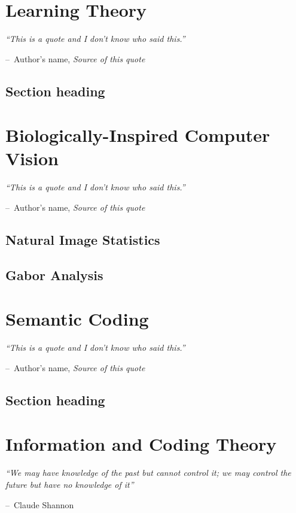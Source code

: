\documentclass[a4paper,11pt]{book}
\makeatletter
\newenvironment{chapquote}[2][2em]
  {\setlength{\@tempdima}{#1}%
   \def\chapquote@author{#2}%
   \parshape 1 \@tempdima \dimexpr\textwidth-2\@tempdima\relax%
   \itshape}
  {\par\normalfont\hfill--\ \chapquote@author\hspace*{\@tempdima}\par\bigskip}
\makeatother
\begin{document}
\chapter{Learning Theory}

\begin{chapquote}{Author's name, \textit{Source of this quote}}
``This is a quote and I don't know who said this.''
\end{chapquote}

\section{Section heading}


\chapter{Biologically-Inspired Computer Vision}

\begin{chapquote}{Author's name, \textit{Source of this quote}}
``This is a quote and I don't know who said this.''
\end{chapquote}

\section{Natural Image Statistics}
\section{Gabor Analysis}

\chapter{Semantic Coding}

\begin{chapquote}{Author's name, \textit{Source of this quote}}
``This is a quote and I don't know who said this.''
\end{chapquote}

\section{Section heading}

\chapter{Information and Coding Theory}

\begin{chapquote}{Claude Shannon}
``We may have knowledge of the past but cannot control it; we may control the future but have no knowledge of it''
\end{chapquote}
\end{document}
